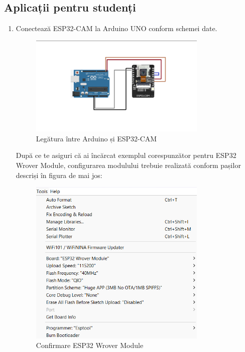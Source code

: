 \documentclass{report}
\begin{document}
\subsection*{Aplicații pentru studenți}
\begin{enumerate}
    \item Conectează ESP32-CAM la Arduino UNO conform schemei date.
    \begin{figure}[H]
    \centering
    \includegraphics[width=0.8\textwidth]{schema_esp.png}
    \caption{Legătura între Arduino și ESP32-CAM}
    \label{fig:esp32_cam}
\end{figure}
\newpage
\vspace*{1cm}
După ce te asiguri că ai încărcat exemplul corespunzător pentru ESP32 Wrover Module, configurarea modulului trebuie realizată conform pașilor descriși în figura de mai jos:

\begin{figure}[H]
    \centering
    \includegraphics[width=0.8\textwidth]{cameraWebServer_tools.png}
    \caption{Confirmare ESP32 Wrover Module}
    \label{fig:esp}
\end{figure}


\end{enumerate}
\end{document}
